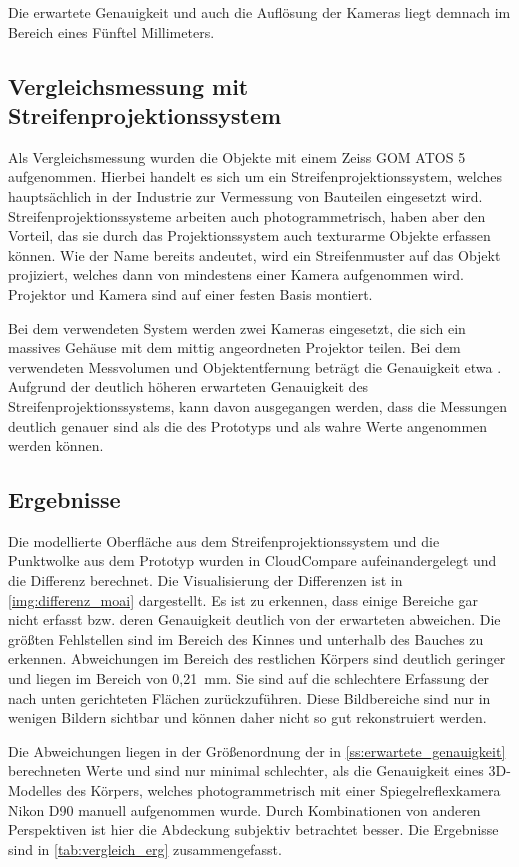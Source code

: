 \documentclass[./00PhotoBox.tex]{subfiles}
\begin{document}
Die erwartete Genauigkeit und auch die Auflösung der Kameras liegt demnach im Bereich eines Fünftel Millimeters.


\subsection{Vergleichsmessung mit Streifenprojektionssystem}
Als Vergleichsmessung wurden die Objekte mit einem Zeiss GOM ATOS 5 aufgenommen. Hierbei handelt es sich um ein Streifenprojektionssystem, welches hauptsächlich in der Industrie zur Vermessung von Bauteilen eingesetzt wird. Streifenprojektionssysteme arbeiten auch photogrammetrisch, haben aber den Vorteil, das sie durch das Projektionssystem auch texturarme Objekte erfassen können. Wie der Name bereits andeutet, wird ein Streifenmuster auf das Objekt projiziert, welches dann von mindestens einer Kamera aufgenommen wird. Projektor und Kamera sind auf einer festen Basis montiert. \citep[S. 581f]{luhmann}

Bei dem verwendeten System werden zwei Kameras eingesetzt, die sich ein massives Gehäuse mit dem mittig angeordneten Projektor teilen. Bei dem verwendeten Messvolumen und Objektentfernung beträgt die Genauigkeit etwa . Aufgrund der deutlich höheren erwarteten Genauigkeit des Streifenprojektionssystems, kann davon ausgegangen werden, dass die Messungen deutlich genauer sind als die des Prototyps und als wahre Werte angenommen werden können.

\subsection{Ergebnisse}
Die modellierte Oberfläche aus dem Streifenprojektionssystem und die Punktwolke aus dem Prototyp wurden in CloudCompare aufeinandergelegt und die Differenz berechnet. Die Visualisierung der Differenzen ist in \autoref{img:differenz_moai} dargestellt. Es ist zu erkennen, dass einige Bereiche gar nicht erfasst bzw. deren Genauigkeit deutlich von der erwarteten abweichen. Die größten Fehlstellen sind im Bereich des Kinnes und unterhalb des Bauches zu erkennen. Abweichungen im Bereich des restlichen Körpers sind deutlich geringer und liegen im Bereich von 0,21~mm. Sie sind auf die schlechtere Erfassung der nach unten gerichteten Flächen zurückzuführen. Diese Bildbereiche sind nur in wenigen Bildern sichtbar und können daher nicht so gut rekonstruiert werden.

Die Abweichungen liegen in der Größenordnung der in \autoref{ss:erwartete_genauigkeit} berechneten Werte und sind nur minimal schlechter, als die Genauigkeit eines 3D-Modelles des Körpers, welches photogrammetrisch mit einer Spiegelreflexkamera Nikon D90 manuell aufgenommen wurde. Durch Kombinationen von anderen Perspektiven ist hier die Abdeckung subjektiv betrachtet besser. Die Ergebnisse sind in \autoref{tab:vergleich_erg} zusammengefasst.
\end{document}
